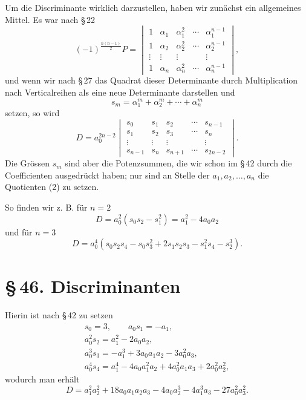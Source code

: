 \documentclass[11pt]{article}
\providecommand{\sect}[2]{\section*{\S\,#1. #2}}
\begin{document}
Um die Discriminante wirklich darzustellen, haben wir zunächst ein allgemeines Mittel. Es war nach \S\,22
\begin{equation}
 (-1)^{\frac{n(n-1)}2}P=
 \begin{vmatrix}
 1&\alpha_1&\alpha_1^2&\cdots&\alpha_1^{n-1}\\
 1&\alpha_2&\alpha_2^2&\cdots&\alpha_2^{n-1}\\
 \vdots&\vdots&\vdots&&\vdots\\
 1&\alpha_n&\alpha_n^2&\cdots&\alpha_n^{n-1}
 \end{vmatrix},
\tag{6}
\end{equation}
und wenn wir nach \S\,27 das Quadrat dieser Determinante durch Multiplication nach Verticalreihen als eine neue Determinante darstellen und
\[
 s_m=\alpha_1^m+\alpha_2^m+\cdots+\alpha_n^m
\]
setzen, so wird
\begin{equation}
 D=a_0^{2n-2}
 \begin{vmatrix}
 s_0&s_1&s_2&\cdots&s_{n-1}\\
 s_1&s_2&s_3&\cdots&s_n\\
 \vdots&\vdots&\vdots&&\vdots\\
 s_{n-1}&s_n&s_{n+1}&\cdots&s_{2n-2}
 \end{vmatrix}.
\tag{7}
\end{equation}
Die Grössen \(s_m\) sind aber die Potenzsummen, die wir schon im \S\,42 durch die Coefficienten ausgedrückt haben; nur sind an Stelle der \(a_1,a_2,\ldots,a_n\) die Quotienten (2) zu setzen.

So finden wir z. B. für \(n=2\)
\begin{equation}
 D=a_0^2(s_0s_2-s_1^2)=a_1^2-4a_0a_2
\tag{8}
\end{equation}
und für \(n=3\)
\begin{equation}
 D=a_0^4(s_0s_2s_4-s_0s_3^2+2s_1s_2s_3-s_1^2s_4-s_2^3).
\tag{9}
\end{equation}

\sect{46}{Discriminanten}

Hierin ist nach \S\,42 zu setzen
\[
\begin{gathered}
 s_0=3,\qquad a_0s_1=-a_1,\\
 a_0^2s_2=a_1^2-2a_0a_2,\\
 a_0^3s_3=-a_1^3+3a_0a_1a_2-3a_0^2a_3,\\
 a_0^4s_4=a_1^4-4a_0a_1^2a_2+4a_0^2a_1a_3+2a_0^2a_2^2,
\end{gathered}
\]
wodurch man erhält
\begin{equation}
D=a_1^2a_2^2+18a_0a_1a_2a_3-4a_0a_2^3-4a_1^3a_3-27a_0^2a_3^2.
\tag{10}
\end{equation}
\end{document}
